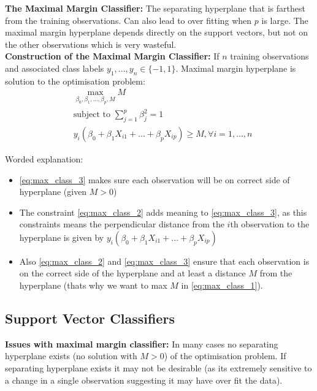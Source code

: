 \documentclass[11pt]{article}
\begin{document}
\noindent \textbf{The Maximal Margin Classifier:} The separating hyperplane that is farthest from the training observations. Can also lead to over fitting when $p$ is large. The maximal margin hyperplane depends directly on the support vectors, but not on the other observations which is very wasteful. \\

\noindent \textbf{Construction of the Maximal Margin Classifier:} If $n$ training observations and associated class labels $y_1,...,y_n \in \{ -1,1 \}$. Maximal margin hyperplane is solution to the optimisation problem:
\begin{align}
    &\max_{\beta_0,\beta_1,...,\beta_p,M}M \label{eq:max_class_1} \\
    &\text{subject to } \sum_{j=1}^{p}{\beta_{j}^{2}} = 1 \label{eq:max_class_2} \\
    &y_i(\beta_0 + \beta_1X_{i1} + ... + \beta_{p}X_{ip}) \geq M, \forall i=1,...,n \label{eq:max_class_3}
\end{align} 

\noindent Worded explanation: 
\begin{itemize}
    \item \eqref{eq:max_class_3} makes sure each observation will be on correct side of hyperplane (given $M>0$)
    \item The constraint \eqref{eq:max_class_2} adds meaning to \eqref{eq:max_class_3}, as this constraints means the perpendicular distance from the $i$th observation to the hyperplane is given by $y_i(\beta_0 + \beta_1X_{i1} + ... + \beta_p X_{ip})$
    \item Also \eqref{eq:max_class_2} and \eqref{eq:max_class_3} ensure that each observation is on the correct side of the hyperplane and at least a distance $M$ from the hyperplane (thats why we want to max $M$ in \eqref{eq:max_class_1}).
\end{itemize}

\subsection{Support Vector Classifiers}

\noindent \textbf{Issues with maximal margin classifier:} In many cases no separating hyperplane exists (no solution with $M>0$) of the optimisation problem. If separating hyperplane exists it may not be desirable (as its extremely sensitive to a change in a single observation suggesting it may have over fit the data). \\
\end{document}
